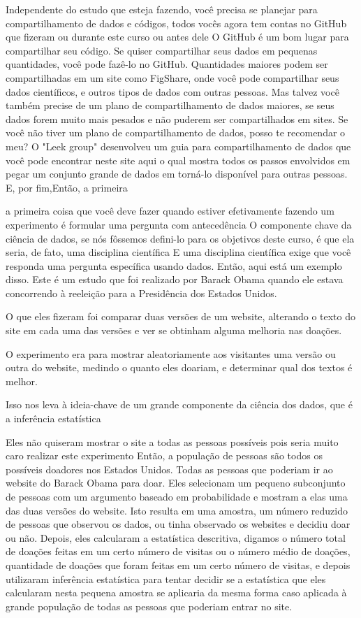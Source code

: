 \begin{multicols}{2}
\begin{footnotesize}
Independente do estudo que esteja fazendo, você precisa se planejar para compartilhamento de dados e códigos, todos vocês agora tem contas no GitHub que fizeram ou durante este curso ou antes dele O GitHub é um bom lugar para compartilhar seu código. Se quiser compartilhar seus dados  em pequenas quantidades, você pode fazê-lo no GitHub. Quantidades maiores podem ser compartilhadas em um site como FigShare, onde você pode compartilhar seus dados científicos, e outros tipos de dados com outras pessoas. Mas talvez você também precise de um plano de compartilhamento de dados maiores, se seus dados forem muito mais pesados e não puderem ser compartilhados em sites. Se você não tiver um plano de compartilhamento de dados, posso te recomendar o meu? O "Leek group" desenvolveu um guia para compartilhamento de dados que você pode encontrar neste site aqui o qual mostra todos os passos envolvidos em pegar um conjunto grande de dados em torná-lo disponível para outras pessoas. E, por fim,Então, a primeira 

a primeira coisa que você deve fazer quando estiver efetivamente fazendo um experimento é formular uma pergunta com antecedência O componente chave da ciência de dados, se nós fôssemos defini-lo para os objetivos deste curso, é que ela seria, de fato, uma disciplina científica E uma disciplina científica exige que você responda uma pergunta específica usando dados. Então, aqui está um exemplo disso. Este é um estudo que foi realizado por Barack Obama quando ele estava concorrendo à reeleição para a Presidência dos Estados Unidos. 

O que eles fizeram foi comparar duas versões de um website, alterando o texto do site em cada uma das versões e ver se obtinham alguma melhoria nas doações. 

O experimento era para mostrar aleatoriamente aos visitantes uma versão ou outra do website, medindo o quanto eles doariam, e determinar qual dos textos é melhor. 

Isso nos leva à ideia-chave de um grande componente da ciência dos dados, que é a inferência estatística 

Eles não quiseram mostrar o site a todas as pessoas possíveis pois seria muito caro realizar este experimento Então, a população de pessoas são todos os possíveis doadores nos Estados Unidos. Todas as pessoas que poderiam ir ao website do Barack Obama para doar. Eles selecionam um pequeno subconjunto de pessoas com um argumento baseado em probabilidade e mostram a elas uma das duas versões do website. Isto resulta em uma amostra, um número reduzido de pessoas que observou os dados, ou tinha observado os websites e decidiu doar ou não. Depois, eles calcularam a estatística descritiva, digamos o número total de doações feitas em um certo número de visitas ou o número médio de doações, quantidade de doações que foram feitas  em um certo número de visitas, e depois utilizaram inferência estatística para tentar decidir se a estatística que eles calcularam nesta pequena amostra se aplicaria  da mesma forma caso aplicada à grande população de todas as pessoas que poderiam entrar no site. 


\end{footnotesize}
\end{multicols}
